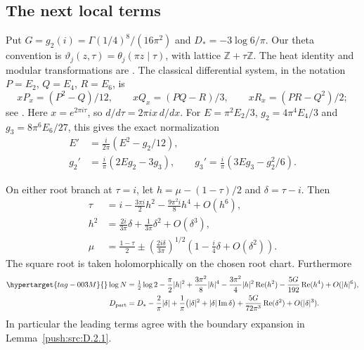 \subsection{The next local terms}
Put $G=g_2(i)=\Gamma(1/4)^8/(16\pi^2)$ and
$D_*=-3\log6/\pi$.
Our theta convention is
$\vartheta_j(z,\tau)=\theta_j(\pi z\mid\tau)$, with lattice
$\mathbb Z+\tau\mathbb Z$.  The heat identity and modular
transformations are \cite[Equations 20.13.1, 20.7.26, 20.7.30
and 23.18.5]{DLMFTheta2026}.  The classical differential system,
in the notation $P=E_2$, $Q=E_4$, $R=E_6$, is
\[
 xP_x=(P^2-Q)/12,\qquad
 xQ_x=(PQ-R)/3,\qquad
 xR_x=(PR-Q^2)/2;
\]
see \cite[Equations (1.1)--(1.4), p.~1]{ErbanVanGorder2021}.
Here $x=e^{2\pi i\tau}$, so
$d/d\tau=2\pi i x\,d/dx$.
For $E=\pi^2E_2/3$, $g_2=4\pi^4E_4/3$ and
$g_3=8\pi^6E_6/27$, this gives the exact normalization
\[
 \begin{split}
 E'&=\frac{i}{2\pi}(E^2-g_2/12),\\
 g_2'&=\frac{i}{\pi}(2Eg_2-3g_3),\qquad
 g_3'=\frac{i}{\pi}(3Eg_3-g_2^2/6).
 \end{split}
\]

\begin{proposition}\hypertarget{tag-000N}{}\label{ari:C.3.1}

On either root branch at $\tau=i$, let
$h=\mu-(1-\tau)/2$ and $\delta=\tau-i$. Then
\begin{align*}
 \tau&=i-\frac{3\pi i}{2}h^2-\frac{9\pi^2i}{8}h^4+O(h^6),\\
 h^2&=\frac{2i}{3\pi}\delta+\frac1{3\pi}\delta^2+O(\delta^3),\\
 \mu&=\frac{1-\tau}{2}
  \mathbin{\pm}\left(\frac{2i\delta}{3\pi}\right)^{1/2}
          \left(1-\frac{i}{4}\delta+O(\delta^2)\right).
\end{align*}
The square root is taken holomorphically on the chosen root chart.
Furthermore
\begin{align}\hypertarget{tag-003M}{}\label{ari:eq:cs-Li}
 \log N={}&\tfrac12\log2-\frac\pi2|h|^2
   +\frac{3\pi^2}{8}|h|^4
   -\frac{3\pi^2}{4}|h|^2\operatorname{Re}(h^2)
   -\frac{5G}{192}\operatorname{Re}(h^4)+O(|h|^6),\\
 D_{\rm part}={}&D_* -\frac2\pi|\delta|
  +\frac1\pi\bigl(|\delta|^2+|\delta|\operatorname{Im}\delta\bigr)
  +\frac{5G}{72\pi^3}\operatorname{Re}(\delta^2)
  +O(|\delta|^3).\nonumber
\end{align}
In particular the leading terms agree with the boundary expansion in Lemma~\ref{push:src:D.2.1}.
\end{proposition}


